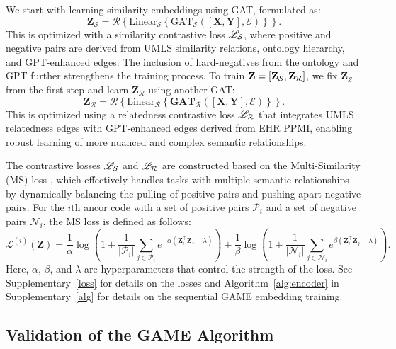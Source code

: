 \documentclass{article}
\def\Rscr{\mathscr{R}}
\def\X{\mathbf{X}}
\def\Y{\mathbf{Y}}
\def\Z{\mathbf{Z}}
\begin{document}
We start with learning similarity embeddings using GAT, formulated as: 
\begin{equation}
    \Z_{\mathcal{S}} =  \Rscr \left\{
\text{Linear}_{\mathcal{S}}\left\{\text{GAT}_{\mathcal{S}}\left([\X,\Y],\mathcal{E} \right)\right\} 
    \right\}.
    \label{SIMI} 
\end{equation}
This is optimized with a similarity contrastive loss $\mathscr{L}_{\mathcal{S}}$, where positive and negative pairs are derived from UMLS similarity relations, ontology hierarchy, and GPT-enhanced edges. The inclusion of hard-negatives from the ontology and GPT further strengthens the training process.   
To train $\Z=[\Z_{\Ssc}, \Z_{\Rsc}]$, we fix $\Z_{\mathcal{S}}$ from the first step and learn $\Z_{\mathcal{R}}$ using another GAT:
\begin{equation}
    \Z_{\mathcal{R}} =  \Rscr\left\{
\text{Linear}_{\mathcal{R}}\left\{\textbf{GAT}_{\mathcal{R}}\left([\X,\Y], \mathcal{E} \right)\right\} 
    \right\}.
    \label{RELA} 
\end{equation}
This is optimized using a relatedness contrastive loss $\mathscr{L}_{\mathcal{R}}$ that integrates UMLS relatedness edges with GPT-enhanced edges derived from EHR PPMI, enabling robust learning of more nuanced and complex semantic relationships.

The contrastive losses $\mathscr{L}_{\mathcal{S}}$ and $\mathscr{L}_{\mathcal{R}}$ are constructed based on the Multi-Similarity (MS) loss \citep{wang2019multi}, which effectively handles tasks with multiple semantic relationships by dynamically balancing the pulling of positive pairs and pushing apart negative pairs. For the $i$th ancor code with a set of positive pairs $\mathcal{P}_i$ and a set of negative pairs $\mathcal{N}_i$, the MS loss is defined as follows:
\begin{equation} \mathcal{L}^{(i)} (\mathbf{Z}) = \frac{1}{\alpha} \log \left( 1 + \frac{1}{|\mathcal{P}_i|} \sum_{j \in \mathcal{P}_i} e^{-\alpha (\mathbf{Z}_i^\top \mathbf{Z}_j - \lambda)} \right) + \frac{1}{\beta}\log \left( 1 + \frac{1}{|\mathcal{N}_i|} \sum_{j \in \mathcal{N}_i} e^{\beta (\mathbf{Z}_i^\top \mathbf{Z}_j - \lambda)} \right). \label{M_S} \end{equation}
Here, $\alpha$, $\beta$, and $\lambda$ are hyperparameters that control the strength of the loss.  See Supplementary~\ref{loss} for details on the losses and Algorithm~\ref{alg:encoder} in Supplementary~\ref{alg} for details on the sequential GAME embedding training.


\subsection{Validation of the GAME Algorithm}\label{sec:val}
\end{document}
